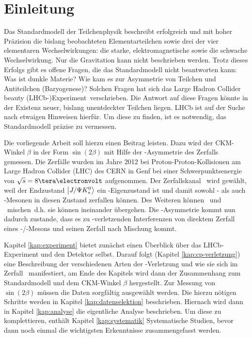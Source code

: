 \chapter{Einleitung}
Das Standardmodell der Teilchenphysik beschreibt erfolgreich und mit hoher Präzision die bislang beobachteten Elementarteilchen sowie drei der vier elementaren Wechselwirkungen: die starke, elektromagnetische sowie die schwache Wechselwirkung. Nur die Gravitation kann nicht beschrieben werden. Trotz dieses Erfolgs gibt es offene Fragen, die das Standardmodell nicht beantworten kann: Was ist dunkle Materie? Wie kam es zur Asymmetrie von Teilchen und Antiteilchen (Baryogenese)? Solchen Fragen hat sich das \glqq Large Hadron Collider beauty (LHCb-)Experiment\grqq\ verschrieben. Die Antwort auf diese Fragen könnte in der Existenz neuer, bislang unentdeckter Teilchen liegen. LHCb ist auf der Suche nach etwaigen Hinweisen hierfür.  Um diese zu finden, ist es notwendig, das Standardmodell präzise zu vermessen. \cite{cern-courier, roadmap}

Die vorliegende Arbeit soll hierzu einen Beitrag leisten. Dazu wird der CKM-Winkel $\beta$ in der Form $\sin(2\beta)$ mit Hilfe der \CP-Asymmetrie des Zerfalls \Decaychannel gemessen. Die Zerfälle wurden im Jahre 2012 bei Proton-Proton-Kollisionen am Large Hadron Collider (LHC) des CERN in Genf bei einer Schwerpunktsenergie von $\sqrt{s}=8\tera\electronvolt$ aufgenommen. Der Zerfallskanal \Decaychannel\ wird gewählt, weil der Endzustand $\Ket{J/\Psi K_s^0}$ ein \CP-Eigenzustand ist und damit sowohl \Bd- als auch \Bdbar-Mesonen in diesen Zustand zerfallen können. Des Weiteren können \Bd\ und \Bdbar\ \glqq mischen\grqq\, d.h. sie können ineinander übergehen. Die \CP-Asymmetrie kommt nun dadurch zustande, dass es zu \CP-verletzenden Interferenzen von direktem Zerfall eines \Bd-/\Bdbar-Mesons und seinen Zerfall nach Mischung kommt.

Kapitel \ref{kap:experiment} bietet zunächst einen Überblick über das LHCb-Experiment und den Detektor selbst. Darauf folgt (Kapitel \ref{kap:cp-verletzung}) eine Beschreibung der verschiedenen Arten der \CP-Verletzung und wie sie sich im Zerfall \Decaychannel\ manifestiert, am Ende des Kapitels wird dann der Zusammenhang zum Standardmodell und dem CKM-Winkel $\beta$ hergestellt. Zur Messung von $\sin(2\beta)$ müssen die Daten sorgfältig ausgewählt werden. Die hierzu nötigen Schritte werden in Kapitel \ref{kap:datenselektion} beschrieben. Hiernach wird dann in Kapitel \ref{kap:analyse} die eigentliche Analyse beschrieben. Um diese zu komplettieren, enthält Kapitel \ref{kap:systematik} Systematische Studien, bevor dann noch einmal die wichtigsten Erkenntnisse zusammengefasst werden.